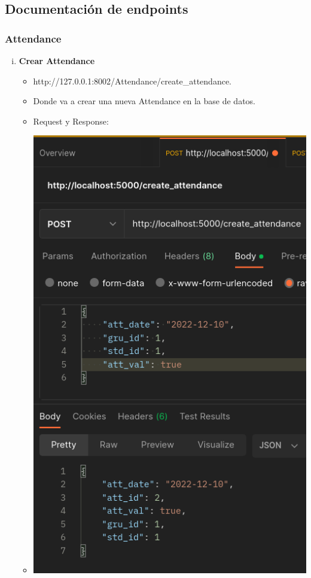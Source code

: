 \documentclass{article}
\begin{document}
\subsection{Documentación de endpoints}


\subsubsection{Attendance}
\begin{enumerate}[i.]
    \item \textbf{Crear Attendance}
    \begin{itemize}
        \item http://127.0.0.1:8002/Attendance/create\_attendance.
        \item Donde va a crear una nueva Attendance en la base de datos.
        \item Request y Response:
        \item \includegraphics[scale=.5]{assets/attendance/create.png}

\end{itemize}
\end{enumerate}
\end{document}
